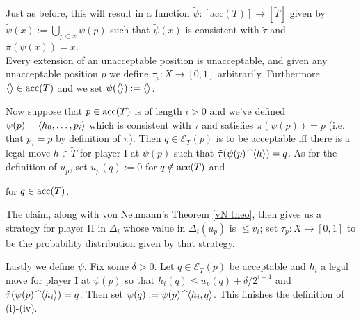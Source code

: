 Just as before, this will result in a function $\tilde\psi:[\text{acc}(T)]\to[\tilde T]$ given by $\tilde\psi(x):=\bigcup_{p\subset x}\psi(p)$ such that $\tilde\psi(x)$ is consistent with $\tilde\tau$ and $\pi(\psi(x))=x$.\\

Every extension of an unacceptable position is unacceptable, and given any unacceptable position $p$ we define $\tau_p:X\to [0,1]$ arbitrarily. Furthermore $\langle \rangle\in\operatorname{\text{acc}}(T)$ and we set $\psi(\langle \rangle):=\langle \rangle$.

\qquad Now suppose that $p\in\operatorname{\text{acc}}(T)$ is of length $i>0$ and we've defined $\psi(p)=\langle h_0,\hdots,p_i\rangle$ which is consistent with $\tilde\tau$ and satisfies $\pi(\psi(p))=p$ (i.e. that $p_i=p$ by definition of $\pi$). Then $q\in\mathcal{E}_T(p)$ is to be acceptable iff there is a legal move $h\in\tilde T$ for player I at $\psi(p)$ such that $\tilde\tau(\psi(p)\operatorname{\text{\textasciicircum}}\langle h\rangle)=q$. As for the definition of $u_p$, set $u_p(q):=0$ for $q\notin\operatorname{\text{acc}}(T)$ and 

for $q\in\operatorname{\text{acc}}(T)$.


The claim, along with von Neumann's Theorem \ref{vN theo}, then gives us a strategy for player II in $\Delta_i$ whose value in $\Delta_i(u_p)$ is $\leq v_i$; set $\tau_p:X\to[0,1]$ to be the probability distribution given by that strategy.

\qquad Lastly we define $\psi$. Fix some $\delta>0$. Let $q\in\mathcal{E}_T(p)$ be acceptable and $h_i$ a legal move for player I at $\psi(p)$ so that $h_i(q)\leq u_p(q)+\delta/2^{i+1}$ and $\tilde\tau(\psi(p)\operatorname{\text{\textasciicircum}}\langle h_i\rangle)=q$. Then set $\psi(q):=\psi(p)\operatorname{\text{\textasciicircum}}\langle h_i,q\rangle$. This finishes the definition of (i)-(iv).

